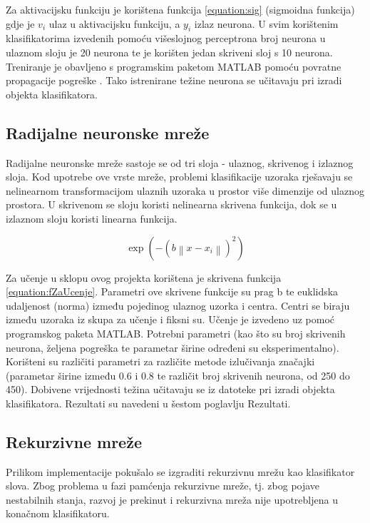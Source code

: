 \documentclass[a4paper,twocolumn,dvipdfm]{article}
\begin{document}
Za aktivacijsku funkciju je korištena funkcija \ref{equation:sig} (sigmoidna
funkcija) gdje je $v_i$ ulaz u aktivacijsku funkciju, a $y_i$ izlaz neurona. U
svim korištenim klasifikatorima izvedenih pomoću višeslojnog perceptrona broj
neurona u ulaznom sloju je 20 neurona te je korišten jedan skriveni sloj s 10
neurona. Treniranje je obavljeno s programskim paketom MATLAB pomoću povratne
propagacije pogreške \cite{rumelhart1986learning}. Tako istrenirane težine
neurona se učitavaju pri izradi objekta klasifikatora.

\subsection{Radijalne neuronske mreže}
Radijalne neuronske mreže sastoje se od tri sloja - ulaznog, skrivenog i
izlaznog sloja. Kod upotrebe ove vrste mreže, problemi klasifikacije uzoraka rješavaju se nelinearnom transformacijom ulaznih uzoraka u prostor više dimenzije od ulaznog prostora. U skrivenom se sloju koristi nelinearna skrivena
funkcija, dok se u izlaznom sloju koristi linearna funkcija.

\begin{equation}
\exp(-\left (b \left \| x - x_{i} \right \|  \right )^{2})
\label{equation:fZaUcenje}
\end{equation}

Za učenje u sklopu ovog projekta korištena je skrivena funkcija \ref{equation:fZaUcenje}. Parametri ove skrivene funkcije su prag b te euklidska udaljenost (norma) između pojedinog ulaznog uzorka i centra. Centri se biraju između uzoraka iz skupa za učenje i fiksni su. Učenje je izvedeno uz pomoć programskog paketa MATLAB. Potrebni parametri (kao što su broj skrivenih neurona, željena pogreška te parametar širine određeni su eksperimentalno). Korišteni su različiti parametri za  različite metode izlučivanja značajki (parametar širine između 0.6 i 0.8 te različit broj skrivenih neurona, od 250 do 450).
Dobivene vrijednosti težina učitavaju se iz datoteke pri izradi objekta klasifikatora. Rezultati su navedeni u šestom poglavlju Rezultati.  

\subsection{Rekurzivne mreže}
Prilikom implementacije pokušalo se izgraditi rekurzivnu mrežu kao klasifikator slova. 
Zbog problema u fazi pamćenja rekurzivne mreže, tj. zbog pojave nestabilnih stanja, 
razvoj je prekinut i rekurzivna mreža nije upotrebljena u konačnom klasifikatoru.
\end{document}
